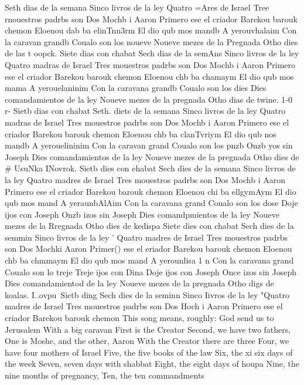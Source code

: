{Seth dias de la semana 
Sinco livros de la ley 
Quatro =Ares de Israel 
Tree rnouestros padrbs son 
Dos Mochb i Aaron 
Primero ese el criador 
Barekou barouk chemon 
Eloenou dab ba elinTnn3rm 
El dio qub mos mandb 
A yerouvhalaim 
Con la caravan grandb 
Coualo son los noueve 
Noueve mezes de la Pregnada 
Otho dies de las t oopck.
Siete dias con chabat 
Sech dias de la semAns 
Sinco livros de la ley 
Quatro madras de Israel 
Tres mouestros padrbs son 
Dos Mochb i Aaron 
Primero ese el criador 
Barekou barouk chemon 
Eloenou chb ba chamaym 
El dio qub mos mama 
A yerouelaninim 
Con la caravana grandb 
Coualo son los dies 
Dies comandamientos de la ley 
Noueve mezes de la pregnada 
Otho dias de twine.
1-0 %
r-
Sietb dias con chabat 
Seth.
diets de la semana 
Sinco livros de la ley 
Quatro madras de Israel 
Tres mouestros padrbs son 
Dos Mochb i Aaron 
Primero ese el criador 
Barekou barouk chemon 
Eloenou chb ba clanTvriym 
El dio qub nos mandb 
A yerouelininim 
Con la caravan grand 
Coualo son los pnzb 
Onzb yos sin Joseph 
Dies comandamientos de la ley 
Noueve mezes de la pregnada 
Otho dies de # UsuNka INovrok.
Sietb dies con ehabat 
Sech dies de la semana 
Sinco livros de la ley 
Quatro madres de Israel 
Tres mouestros padrbs son 
Dos Mochb i Aaron 
Primero ese el criador 
Barekou barouk chemon 
Eloenou chi ba ellgymAym 
El dio qub mos mand 
A yeraunbAlAim 
Con la caravana grand 
Coualo son los dose 
Doje ijos con Joseph 
Onzb izos sin Joseph 
Dies comandpmientos de la ley 
Noueve mezes de la Rregnada 
Otho dies de kedispa 
Siete dies con chabat 
Sech dies de la semmin 
Sinco livros de la ley ' 
Quatro madres de Israel 
Tres mouestros padrbs son 
Dos Mochki Aaron 
Primer() ese el eriador 
Barekou barouk chemon 
Eloenou chb ba chmmaym 
El dio qub mos mand 
A yerounlisa 1 n 
Con la caravana grand 
Coualo son lo treje 
Treje ijos con Dina 
Doje ijos con Joseph 
Once izos sin Joseph 
Dies comandamientod de la ley 
Noueve mezes de la pregnada 
Otho digs de koalas.
I..ovpu\ 
Sietb ding%
Sech dies de la seminn 
Sinco Iivros de la ley 
"Quatro madres de Israel 
Tres mouestros padrbs son 
Dos Hoch i Aaron 
Primero ese el criador 
Barekou barouk chemon 
This song means, roughly: 
God send us to Jerusalem 
With a big caravan 
First is the Creator 
Second, we have two fathers, 
One is Moshe, and the other, Aaron 
With the Creator there are three 
Four, we have four mothers of Israel 
Five, the five books of the law 
Six, the xi six days of the week 
Seven, seven days with shabbat 
Eight, the eight days of houpa 
Nine, the nine months of pregnancy, 
Ten, the ten commandments 
}
